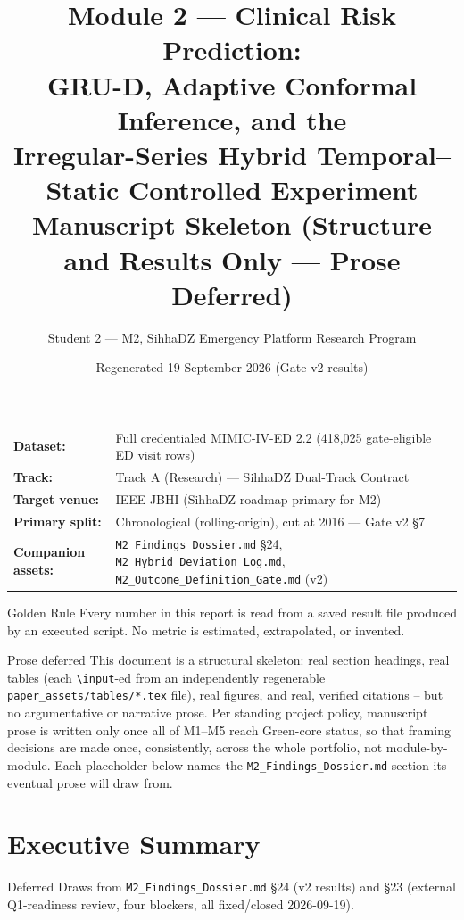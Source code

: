 \documentclass[11pt]{article}
\title{\textbf{\Large Module 2 --- Clinical Risk Prediction:\\[2pt] GRU-D, Adaptive Conformal Inference, and the\\[2pt] Irregular-Series Hybrid Temporal--Static Controlled Experiment}\\[8pt]
\large Manuscript Skeleton (Structure and Results Only --- Prose Deferred)}
\author{Student 2 --- M2, SihhaDZ Emergency Platform Research Program}
\date{Regenerated 19 September 2026 (Gate v2 results)}
\begin{document}
\maketitle

\begin{center}
\begin{tabular}{ll}
\textbf{Dataset:} & Full credentialed MIMIC-IV-ED 2.2 (418{,}025 gate-eligible ED visit rows) \\
\textbf{Track:} & Track A (Research) --- SihhaDZ Dual-Track Contract \\
\textbf{Target venue:} & IEEE JBHI (SihhaDZ roadmap primary for M2) \\
\textbf{Primary split:} & Chronological (rolling-origin), cut at 2016 --- Gate v2 \S7 \\
\textbf{Companion assets:} & \texttt{M2\_Findings\_Dossier.md} \S24, \texttt{M2\_Hybrid\_Deviation\_Log.md}, \texttt{M2\_Outcome\_Definition\_Gate.md} (v2) \\
\end{tabular}
\end{center}

\vspace{4mm}
\begin{note}{Golden Rule}
Every number in this report is read from a saved result file produced by an executed script. No metric is estimated, extrapolated, or invented.
\end{note}

\begin{prosetodo}{Prose deferred}
This document is a structural skeleton: real section headings, real tables (each \texttt{\textbackslash input}-ed from an independently regenerable \texttt{paper\_assets/tables/*.tex} file), real figures, and real, verified citations -- but no argumentative or narrative prose. Per standing project policy, manuscript prose is written only once all of M1--M5 reach Green-core status, so that framing decisions are made once, consistently, across the whole portfolio, not module-by-module. Each placeholder below names the \texttt{M2\_Findings\_Dossier.md} section its eventual prose will draw from.
\end{prosetodo}

\tableofcontents
\newpage

\section{Executive Summary}
\begin{prosetodo}{Deferred}
Draws from \texttt{M2\_Findings\_Dossier.md} \S24 (v2 results) and \S23 (external Q1-readiness review, four blockers, all fixed/closed 2026-09-19).
\end{prosetodo}
\end{document}

